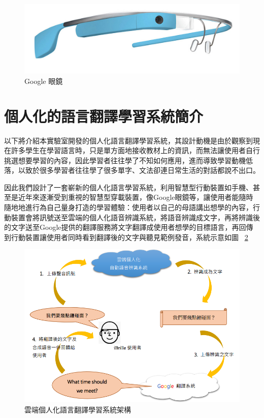 \begin{figure}
\centering
\includegraphics[scale=0.2]{images/glass.jpg}
\caption{Google 眼鏡} \label{fig:glass}
\end{figure}

\section{個人化的語言翻譯學習系統簡介}

以下將介紹本實驗室開發的個人化語言翻譯學習系統，其設計動機是由於觀察到現在許多學生在學習語言時，只是單方面地接收教材上的資訊，而無法讓使用者自行挑選想要學習的內容，因此學習者往往學了不知如何應用，進而導致學習動機低落，以致於很多學習者往往學了很多單字、文法卻連日常生活的對話都說不出口。

因此我們設計了一套嶄新的個人化語言學習系統，利用智慧型行動裝置如手機、甚至是近年來逐漸受到重視的智慧型穿載裝置，像Google眼鏡等，讓使用者能隨時隨地地進行為自己量身打造的學習體驗：使用者以自己的母語講出想學的內容，行動裝置會將訊號送至雲端的個人化語音辨識系統，將語音辨識成文字，再將辨識後的文字送至Google提供的翻譯服務將文字翻譯成使用者想學的目標語言，再回傳到行動裝置讓使用者同時看到翻譯後的文字與聽見範例發音，系統示意如圖 ~\ref{fig:chap6_translation_system}

\begin{figure}
\centering
\includegraphics[scale=0.4]{images/chap6_translation_system.png}
\caption{雲端個人化語言翻譯學習系統架構} \label{fig:chap6_translation_system}
\end{figure}

